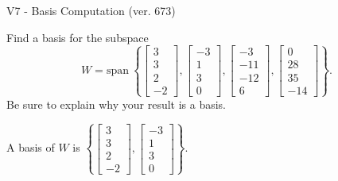 \begin{exercise}
  \begin{exerciseTitle}V7 - Basis Computation (ver. 673)\end{exerciseTitle}
  \begin{exerciseStatement}
    Find a basis for the subspace 
\[W=\mathrm{span}\ \left\{\left[\begin{array}{r}
3 \\
3 \\
2 \\
-2
\end{array}\right] , \left[\begin{array}{r}
-3 \\
1 \\
3 \\
0
\end{array}\right] , \left[\begin{array}{r}
-3 \\
-11 \\
-12 \\
6
\end{array}\right] , \left[\begin{array}{r}
0 \\
28 \\
35 \\
-14
\end{array}\right]\right\}.\]
 Be sure to explain why your result is a basis.


  \end{exerciseStatement}
  \begin{exerciseAnswer}
   A basis of \(W\) is  \(\left\{\left[\begin{array}{r}
3 \\
3 \\
2 \\
-2
\end{array}\right] , \left[\begin{array}{r}
-3 \\
1 \\
3 \\
0
\end{array}\right]\right\}\).
  


  \end{exerciseAnswer}
\end{exercise}